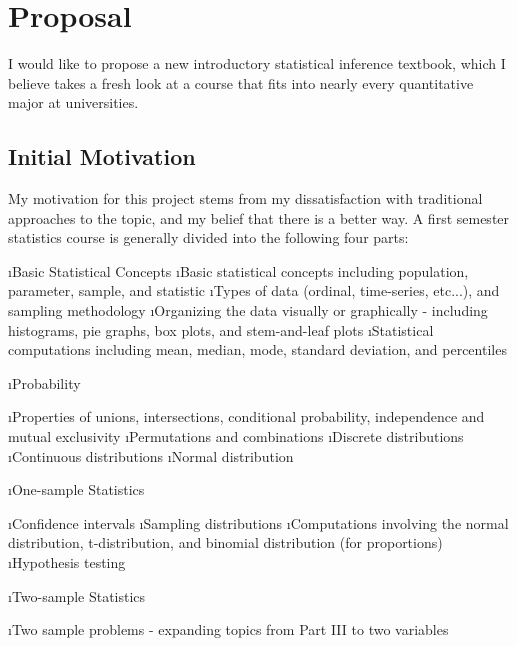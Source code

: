 \chapter*{Proposal}

I would like to propose a new introductory statistical inference textbook, which I believe takes a fresh look at a course that fits into nearly every quantitative major at universities.

\section*{Initial Motivation}

My motivation for this project stems from my dissatisfaction with traditional approaches to the topic, and my belief that there is a better way.  A first semester statistics course is generally divided into the following four parts:

\renewcommand{\labelenumi}{\Roman{enumi}}
\be
\i Basic Statistical Concepts
\bi
\i Basic statistical concepts including population, parameter, sample, and statistic
\i Types of data (ordinal, time-series, etc...), and sampling methodology 
\i Organizing the data visually or graphically - including histograms, pie graphs, box plots, and stem-and-leaf plots
\i Statistical computations including mean, median, mode, standard deviation, and percentiles
\ei

\i Probability

\bi
\i Properties of unions, intersections, conditional probability, independence and mutual exclusivity
\i Permutations and combinations
\i Discrete distributions
\i Continuous distributions 
\i Normal distribution
\ei

\i One-sample Statistics

\bi
\i Confidence intervals
\i Sampling distributions
\i Computations involving the normal distribution, t-distribution, and binomial distribution (for proportions)
\i Hypothesis testing
\ei

\i Two-sample Statistics

\bi
\i Two sample problems - expanding topics from Part III to two variables
\ei
\ee
\renewcommand{\labelenumi}{\arabic{enumi}}

